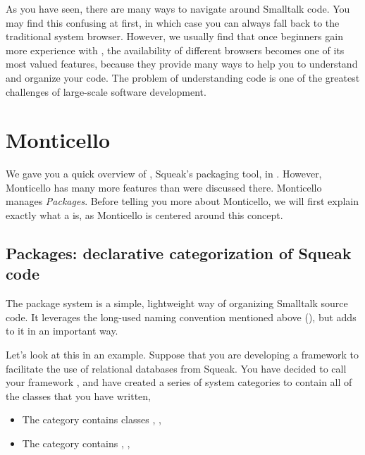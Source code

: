 \documentclass[a4paper,10pt,twoside]{book}
\begin{document}
As you have seen, there are many ways to navigate around Smalltalk code.
You may find this confusing at first, in which case you can always fall back to the traditional system browser.
However, we usually find that once beginners gain more experience with \sq, the availability of different browsers becomes one of its most valued features, because they provide many ways to help you to understand and organize your code.
The problem of understanding code is one of the greatest challenges of large-scale software development.

\section{Monticello}

We gave you a quick overview of , Squeak's packaging tool, in .
However, Monticello has many more features than were discussed there.
Monticello manages \emph{Packages}. Before telling you more about Monticello, we will first explain exactly what a  is, as Monticello is centered around this concept.

\subsection{Packages: declarative categorization of Squeak code}

The package system is a simple, lightweight way of organizing Smalltalk source code.
It leverages the long-used naming convention mentioned above (), but adds to it in an important way.

Let's look at this in an example.
Suppose that you are developing a framework to facilitate the use of relational databases from Squeak.
You have decided to call your framework , and have created a series of system categories to contain all of the classes that you have written, \eg

\begin{itemize}
\item The category  contains classes , , 
\item The category  contains , , 
\end{itemize}
\end{document}
